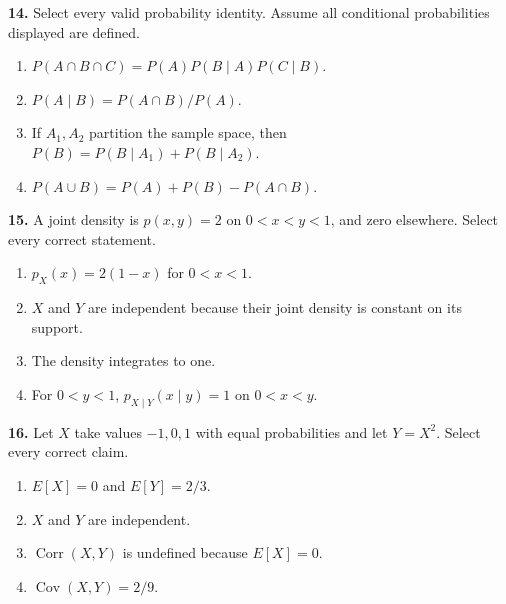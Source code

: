 \documentclass[11pt,a4paper]{article}
\begin{document}
\par\noindent\begin{minipage}{\linewidth}
\textbf{14.} Select every valid probability identity. Assume all conditional probabilities displayed are defined.
\begin{enumerate}[label=(\Alph*),leftmargin=8mm,itemsep=2pt,topsep=2pt]
\item \(P(A\cap B\cap C)=P(A)P(B\mid A)P(C\mid B)\).
\item \(P(A\mid B)=P(A\cap B)/P(A)\).
\item If \(A_1,A_2\) partition the sample space, then \(P(B)=P(B\mid A_1)+P(B\mid A_2)\).
\item \(P(A\cup B)=P(A)+P(B)-P(A\cap B)\).
\end{enumerate}

\end{minipage}\par\vspace{3mm}
\par\noindent\begin{minipage}{\linewidth}
\textbf{15.} A joint density is \(p(x,y)=2\) on \(0<x<y<1\), and zero elsewhere. Select every correct statement.
\begin{enumerate}[label=(\Alph*),leftmargin=8mm,itemsep=2pt,topsep=2pt]
\item \(p_X(x)=2(1-x)\) for \(0<x<1\).
\item \(X\) and \(Y\) are independent because their joint density is constant on its support.
\item The density integrates to one.
\item For \(0<y<1\), \(p_{X\mid Y}(x\mid y)=1\) on \(0<x<y\).
\end{enumerate}

\end{minipage}\par\vspace{3mm}
\par\noindent\begin{minipage}{\linewidth}
\textbf{16.} Let \(X\) take values \(-1,0,1\) with equal probabilities and let \(Y=X^2\). Select every correct claim.
\begin{enumerate}[label=(\Alph*),leftmargin=8mm,itemsep=2pt,topsep=2pt]
\item \(E[X]=0\) and \(E[Y]=2/3\).
\item \(X\) and \(Y\) are independent.
\item \(\operatorname{Corr}(X,Y)\) is undefined because \(E[X]=0\).
\item \(\operatorname{Cov}(X,Y)=2/9\).
\end{enumerate}

\end{minipage}\par\vspace{3mm}
\end{document}
